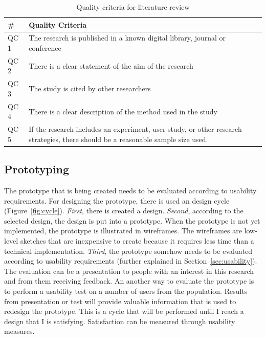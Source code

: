       \begin{table}[H]
        \centering
        \begin{tabular}{| l | p{10cm} |}
          \hline
          {\bf \#} & {\bf Quality Criteria} \\ \hline
          QC 1 & The research is published in a known digital library, journal or conference\\ \hline
          QC 2 & There is a clear statement of the aim of the research\\ \hline
          QC 3 & The study is cited by other researchers\\ \hline
          QC 4 & There is a clear description of the method used in the study\\ \hline
          QC 5 & If the research includes an experiment, user study, or other research strategies, there should be a reasonable sample size used. \\ \hline
        \end{tabular}
        \caption{Quality criteria for literature review}
        \label{tab:QualityCriteria}
      \end{table}
    
    \subsection{Prototyping} \label{sec:methodusabilitytesting}
    The prototype that is being created needs to be evaluated according to usability requirements. For designing the prototype, there is used an design cycle (Figure~\ref{fig:cycle}). {\it First}, there is created a design. {\it Second}, according to the selected design, the design is put into a prototype. When the prototype is not yet implemented, the prototype is illustrated in wireframes. The wireframes are low-level sketches that are inexpensive to create because it requires less time than a technical implementation. {\it Third}, the prototype somehow needs to be evaluated according to usability requirements (further explained in Section~\ref{sec:usability}). The evaluation can be a presentation to people with an interest in this research and from them receiving feedback. An another way to evaluate the prototype is to perform a usability test on a number of users from the population. Results from presentation or test will provide valuable information that is used to redesign the prototype. This is a cycle that will be performed until I reach a design that I is satisfying. Satisfaction can be measured through usability measures.

